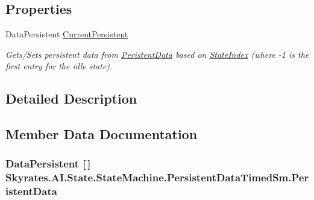 \subsection*{Properties}
\begin{DoxyCompactItemize}
\item 
Data\-Persistent \hyperlink{class_skyrates_1_1_a_i_1_1_state_1_1_state_machine_1_1_persistent_data_timed_sm_a5d2f8683b0175d58351e64b40221a088}{Current\-Persistent}
\begin{DoxyCompactList}\small\item\em Gets/\-Sets persistent data from \hyperlink{class_skyrates_1_1_a_i_1_1_state_1_1_state_machine_1_1_persistent_data_timed_sm_ad47deb6b3717c611995891f5f8bf3b08}{Peristent\-Data} based on \hyperlink{class_skyrates_1_1_a_i_1_1_state_1_1_state_machine_1_1_persistent_data_timed_sm_a5f1edf5fa67ab1b21219bb378f62f778}{State\-Index} (where -\/1 is the first entry for the idle state). \end{DoxyCompactList}\end{DoxyCompactItemize}


\subsection{Detailed Description}




\subsection{Member Data Documentation}
\hypertarget{class_skyrates_1_1_a_i_1_1_state_1_1_state_machine_1_1_persistent_data_timed_sm_ad47deb6b3717c611995891f5f8bf3b08}{
\subsubsection[{Peristent\-Data}]{\setlength{\rightskip}{0pt plus 5cm}Data\-Persistent \mbox{[}$\,$\mbox{]} Skyrates.\-A\-I.\-State.\-State\-Machine.\-Persistent\-Data\-Timed\-Sm.\-Peristent\-Data}}\label{class_skyrates_1_1_a_i_1_1_state_1_1_state_machine_1_1_persistent_data_timed_sm_ad47deb6b3717c611995891f5f8bf3b08}



